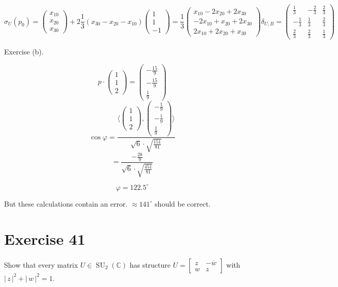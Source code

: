 \documentclass[a4paper]{article}
\theoremstyle{definition}
\newcommand\card[1]{\left|\,#1\,\right|}
\newcommand\ip[2]{\langle{#1},{#2}\rangle}
\begin{document}
\[
  \sigma_U(p_0) = \begin{pmatrix} x_{10} \\ x_{20} \\ x_{30} \end{pmatrix} + 2 \frac13 (x_{30} - x_{20} - x_{10}) \begin{pmatrix} 1 \\ 1 \\ -1 \end{pmatrix}
  = \frac13 \begin{pmatrix} x_{10} - 2x_{20} + 2x_{30} \\ -2x_{10} + x_{20} + 2x_{30} \\ 2x_{10} + 2x_{20} + x_{30} \end{pmatrix} \delta_{U,B} = \begin{pmatrix} \frac13 & -\frac23 & \frac23 \\ -\frac13 & \frac13 & \frac23 \\ \frac23 & \frac23 & \frac13 \end{pmatrix}
\]

Exercise (b).

\[
  p \cdot \begin{pmatrix} 1 \\ 1 \\ 2 \end{pmatrix} = \begin{pmatrix} -\frac{15}9 \\ -\frac{15}9 \\ \frac19 \end{pmatrix}
\] \[
  \cos\varphi = \frac{\ip{\begin{pmatrix} 1 \\ 1 \\ 2\end{pmatrix}}{\begin{pmatrix} -\frac19 \\ -\frac19 \\ \frac19 \end{pmatrix}}}{\sqrt6 \cdot \sqrt{\frac{151}{81}}}
\] \[
  = \frac{-\frac{28}{9}}{\sqrt6 \cdot \sqrt{\frac{451}{81}}}
\]

\[ \varphi = 122.5^\circ \]

But these calculations contain an error. $\approx 141^\circ$ should be correct.

\section{Exercise 41}
\begin{ex}
  Show that every matrix $U \in \operatorname{SU}_2(\mathbb C)$ has structure $U = \begin{bmatrix} z & -\overline{w} \\ w & z \end{bmatrix}$ with $\card{z}^2 + \card{w}^2 = 1$.
\end{ex}
\end{document}
